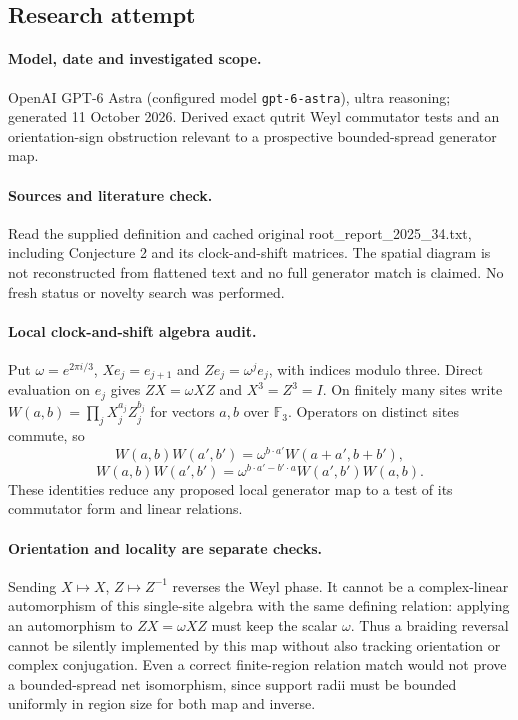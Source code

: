 \documentclass[11pt]{article}
\begin{document}
\subsection{Research attempt}
\paragraph{Model, date and investigated scope.}
OpenAI GPT-6 Astra (configured model \texttt{gpt-6-astra}), ultra reasoning; generated 11 October 2026. Derived exact qutrit Weyl commutator tests and an orientation-sign obstruction relevant to a prospective bounded-spread generator map.

\paragraph{Sources and literature check.}
Read the supplied definition and cached original root\_report\_2025\_34.txt, including Conjecture 2 and its clock-and-shift matrices. The spatial diagram is not reconstructed from flattened text and no full generator match is claimed. No fresh status or novelty search was performed.

\paragraph{Local clock-and-shift algebra audit.} Put \(\omega=e^{2\pi i/3}\), \(Xe_j=e_{j+1}\) and \(Ze_j=\omega^je_j\), with indices modulo three. Direct evaluation on \(e_j\) gives \(ZX=\omega XZ\) and \(X^3=Z^3=I\). On finitely many sites write \(W(a,b)=\prod_jX_j^{a_j}Z_j^{b_j}\) for vectors \(a,b\) over \(\mathbb F_3\). Operators on distinct sites commute, so
\[
 W(a,b)W(a',b')=\omega^{b\cdot a'}W(a+a',b+b'),
\]
\[
 W(a,b)W(a',b')=\omega^{b\cdot a'-b'\cdot a}W(a',b')W(a,b).
\]
These identities reduce any proposed local generator map to a test of its commutator form and linear relations.
\paragraph{Orientation and locality are separate checks.} Sending \(X\mapsto X\), \(Z\mapsto Z^{-1}\) reverses the Weyl phase. It cannot be a complex-linear automorphism of this single-site algebra with the same defining relation: applying an automorphism to \(ZX=\omega XZ\) must keep the scalar \(\omega\). Thus a braiding reversal cannot be silently implemented by this map without also tracking orientation or complex conjugation. Even a correct finite-region relation match would not prove a bounded-spread net isomorphism, since support radii must be bounded uniformly in region size for both map and inverse.
\end{document}
